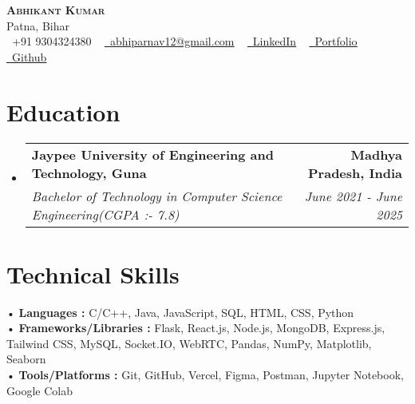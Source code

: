 \documentclass[letterpaper,11pt]{article}
\makeatletter
\newcommand{\resumeSubheading}[4]{
  \vspace{-2pt}\item
	\begin{tabular*}{1.0\textwidth}[t]{l@{\extracolsep{\fill}}r}
  	\textbf{#1} & \textbf{\small #2} \\
  	\textit{\small#3} & \textit{\small #4} \\
	\end{tabular*}\vspace{-7pt}
}
\newcommand{\resumeSubHeadingListStart}{\begin{itemize}[leftmargin=0.0in, label={}]}
\newcommand{\resumeSubHeadingListEnd}{\end{itemize}}
\makeatother
\begin{document}
 

\begin{center}
	{\Huge  {\scshape \textbf{Abhikant Kumar}}} \\ \vspace{3pt}
	Patna, Bihar  \\ \vspace{3pt}
	\small \raisebox{-0.1\height}\faPhone\ +91 9304324380 ~ \href{mailto:x@gmail.com}{\raisebox{-0.2\height}\faEnvelope\  \underline{abhiparnav12@gmail.com}} ~
	\href{https://linkedin.com/in//}{\raisebox{-0.2\height}\faLinkedin\ \underline{LinkedIn}} ~
   \href{https://abhikant-portfolio.netlify.app/}{\raisebox{-0.2\height}\faGlobe\ \underline{Portfolio}} ~ \href{https://github.com/abhikant12}{\raisebox{-0.2\height}\faGithub\ \underline{Github}}
\end{center}


 
\section{Education}
\begin{itemize}[leftmargin=0.12in, label={}]
  \vspace{-9pt}
  \resumeSubHeadingListStart
    \resumeSubheading
    {Jaypee University of Engineering and Technology, Guna}{Madhya Pradesh, India}
    {Bachelor of Technology in Computer Science Engineering(CGPA  :-  7.8)}{June 2021 - June 2025}
   \vspace{-1pt}
  \resumeSubHeadingListEnd
\end{itemize} 



\section{Technical Skills }
 \begin{itemize}[leftmargin=0.12in, label={}]
        \vspace{-2pt}
    \small{\item{
    \hspace{-5pt}• \textbf{Languages : }{ C/C++, Java, JavaScript, SQL, HTML, CSS, Python } \\  \vspace{3pt}
        \hspace{-5pt}• \textbf{Frameworks/Libraries :}  {Flask, React.js, Node.js, MongoDB, Express.js, Tailwind CSS, MySQL, Socket.IO, WebRTC, Pandas, NumPy, Matplotlib, Seaborn} \\  \vspace{3pt}
        \hspace{-5pt}• \textbf{Tools/Platforms :}  {Git, GitHub, Vercel, Figma, Postman, Jupyter Notebook, Google Colab} \\
    }}
 \end{itemize}
 \vspace{-13pt}
\end{document}
